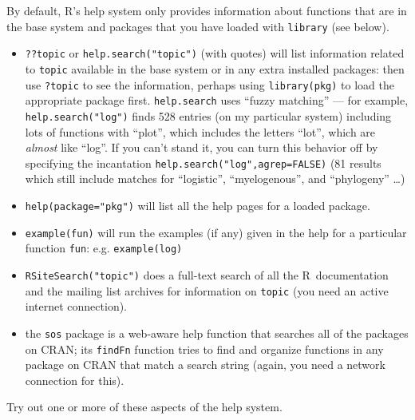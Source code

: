 \documentclass[11pt]{article}\usepackage[]{graphicx}\usepackage[]{color}
\newcommand{\code}[1]{{\tt #1}}
\newcommand\R{{\sf R}}
\numberwithin{exercise}{section}
\begin{document}
By default, \R's help system only provides information 
about functions that are in the base system and packages
that you have loaded with \code{library} (see below).
\begin{itemize}
\item \code{??topic} or \code{help.search("topic")} 
  (with quotes)
will list information
related to \code{topic} available in the base system 
or in any extra installed packages:
then use \code{?topic} to see the information, perhaps using
\code{library(pkg)} to load the appropriate package first.
\code{help.search} uses ``fuzzy matching'' --- for example, 
\code{help.search("log")} finds 528 entries (on my
particular system) including lots of
functions with ``plot'', which includes the letters ``lot'', which
are \emph{almost} like ``log''.  If you can't stand it, you
can turn this behavior off by specifying the incantation
\code{help.search("log",agrep=FALSE)} (81 results which still include
matches for ``logistic'', ``myelogenous'', and ``phylogeny'' \ldots)
\item \code{help(package="pkg")} will list all the help pages for
a loaded package.
\item \code{example(fun)} will run the examples (if any) given
  in the help for a particular function \code{fun}: e.g. \code{example(log)}
\item \code{RSiteSearch("topic")} does a full-text
  search of all the \R\ documentation and the mailing list archives
  for information on \code{topic} (you need an active
  internet connection).  
\item the \code{sos} package is a web-aware help function that
  searches all of the packages on CRAN; its \code{findFn} function
  tries to find and organize functions in any package on CRAN that
  match a search string (again, you need a network connection for this).
\end{itemize}

Try out one or
more of these aspects of the help system.


\end{document}
